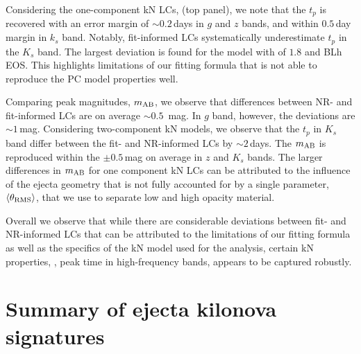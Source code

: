 Considering the one-component \ac{kN} \acp{LC}, (top panel), we note that the $t_p$ is 
recovered with an error margin of ${\sim}0.2\,$days in $g$ and $z$ bands, and within 
$0.5\,$day margin in $k_s$ band. Notably, fit-informed \acp{LC} 
systematically underestimate $t_p$ in the $K_s$ band. 
%
The largest deviation is found for the 
model with \mr{} of $1.8$ and BLh \ac{EOS}. This highlights limitations of our 
fitting formula that is not able to reproduce the \ac{PC} model properties well.

Comparing peak magnitudes, $m_{\rm AB}$, we observe that differences 
between \ac{NR}- and fit-informed \acp{LC} are on average ${\sim}0.5$~mag. 
In $g$ band, however, the deviations are ${\sim}1\,$mag.
Considering two-component \ac{kN} models, we observe that the 
$t_p$ in $K_s$ band differ between the fit- and \ac{NR}-informed \acp{LC} by 
${\sim}2\,$days. The $m_{\rm AB}$ is reproduced within the ${\pm}0.5\,$mag 
on average in $z$ and $K_s$ bands.
%
The larger differences in $m_{\rm AB}$ for one component \ac{kN} \acp{LC} 
can be attributed to the influence of the ejecta geometry that is not 
fully accounted for by a single parameter, $\langle\theta_{\rm RMS}\rangle$, that we use to 
separate low and high opacity material. 

Overall we observe that while there are considerable deviations between fit- and 
\ac{NR}-informed \acp{LC} that can be attributed to the limitations of 
our fitting formula as well as the specifics of the \ac{kN} model used for the 
analysis, certain \ac{kN} properties, \eg, peak time in high-frequency bands, 
appears to be captured robustly. 





\section{Summary of ejecta kilonova signatures}\label{sec:kilonova:summary}


